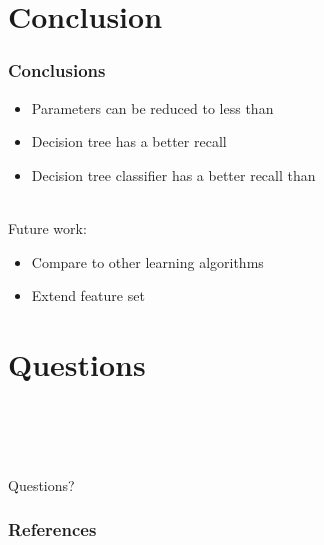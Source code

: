 \documentclass{beamer}
\begin{document}
\begin{frame}

\end{frame}

\begin{frame}
\end{frame}

\begin{frame}
\end{frame}

\begin{frame}

\end{frame}

\begin{frame}

\end{frame}


\section{Conclusion}
\begin{frame}
\frametitle{Conclusions}
\begin{itemize}
\item Parameters can be reduced to less than 
\item Decision tree has a better recall
\item Decision tree classifier has a better recall than 
\end{itemize}
~\\Future work:
\begin{itemize}
\item Compare to other learning algorithms
\item Extend feature set
\end{itemize}
\end{frame}

\section[Questions]{Questions}
\begin{frame}
~ \\~ \\~ \\
\begin{center}\Huge Questions? \end{center} 
\end{frame}

\begin{frame}[allowframebreaks]
        \frametitle{References}
        
        
\end{frame}
\end{document}
